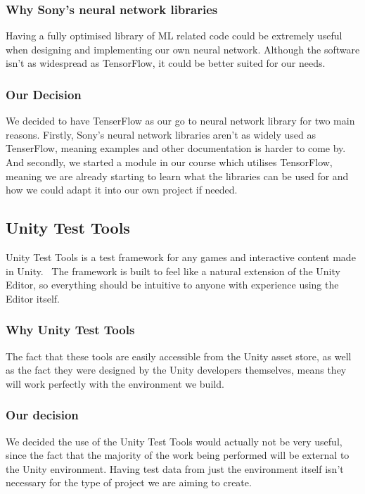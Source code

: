 \subsubsection{Why Sony’s neural network libraries}
Having a fully optimised library of ML related code could be extremely useful when designing and implementing our own neural network. Although the software isn’t as widespread as TensorFlow, it could be better suited for our needs.

\subsubsection{Our Decision}
We decided to have TenserFlow as our go to neural network library for two main reasons. Firstly, Sony’s neural network libraries aren’t as widely used as TenserFlow, meaning examples and other documentation is harder to come by. And secondly, we started a module in our course which utilises TensorFlow, meaning we are already starting to learn what the libraries can be used for and how we could adapt it into our own project if needed.

\subsection{Unity Test Tools} 
Unity Test Tools is a test framework for any games and interactive content made in Unity.~\cite{unityTT} The framework is built to feel like a natural extension of the Unity Editor, so everything should be intuitive to anyone with experience using the Editor itself.

\subsubsection{Why Unity Test Tools}
The fact that these tools are easily accessible from the Unity asset store, as well as the fact they were designed by the Unity developers themselves, means they will work perfectly with the environment we build.~\cite{unityWebsite}

\subsubsection{Our decision}
We decided the use of the Unity Test Tools would actually not be very useful, since the fact that the majority of the work being performed will be external to the Unity environment. Having test data from just the environment itself isn’t necessary for the type of project we are aiming to create.

